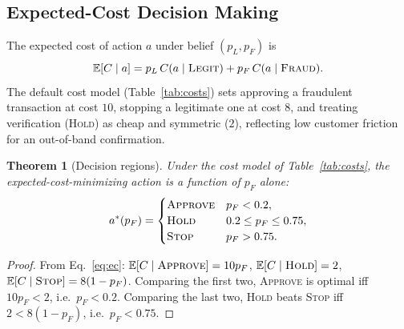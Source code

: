 \documentclass{article}
\newtheorem{theorem}{Theorem}
\begin{document}
\subsection{Expected-Cost Decision Making}

The expected cost of action $a$ under belief $(p_L, p_F)$ is
\begin{equation}
  \mathbb{E}[C \mid a] = p_L \, C(a \mid \textsc{Legit})
  + p_F \, C(a \mid \textsc{Fraud}).
\label{eq:ec}
\end{equation}
The default cost model (Table~\ref{tab:costs}) sets approving a fraudulent
transaction at cost $10$, stopping a legitimate one at cost $8$, and treating
verification (\textsc{Hold}) as cheap and symmetric ($2$), reflecting low
customer friction for an out-of-band confirmation.

\begin{theorem}[Decision regions]
\label{thm:decision-regions}
Under the cost model of Table~\ref{tab:costs}, the expected-cost-minimizing
action is a function of $p_F$ alone:
\begin{equation}
  a^*(p_F) = \begin{cases}
    \textsc{Approve} & p_F < 0.2,\\
    \textsc{Hold}    & 0.2 \le p_F \le 0.75,\\
    \textsc{Stop}    & p_F > 0.75 .
  \end{cases}
\end{equation}
\end{theorem}

\begin{proof}
From Eq.~\eqref{eq:ec}: $\mathbb{E}[C \mid \textsc{Approve}] = 10 p_F$,
$\mathbb{E}[C \mid \textsc{Hold}] = 2$,
$\mathbb{E}[C \mid \textsc{Stop}] = 8(1 - p_F)$.
Comparing the first two, \textsc{Approve} is optimal iff $10 p_F < 2$,
i.e.\ $p_F < 0.2$. Comparing the last two, \textsc{Hold} beats \textsc{Stop}
iff $2 < 8(1 - p_F)$, i.e.\ $p_F < 0.75$.
\end{proof}
\end{document}
